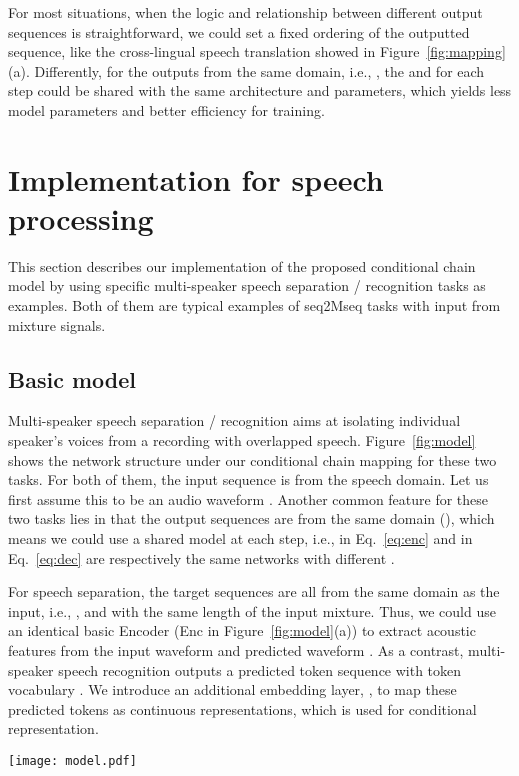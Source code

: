 \documentclass{article}
\begin{document}
For most situations, when the logic and relationship between different output sequences is straightforward, we could set a fixed ordering of the outputted sequence, like the cross-lingual speech translation showed in Figure~\ref{fig:mapping}(a). 
Differently, for the outputs from the same domain, i.e.,  , the  and  for each step could be shared with the same architecture and parameters, which yields less model parameters and better efficiency for training. 


\section{Implementation for speech processing}\label{sec:imp}
This section describes our implementation of the proposed conditional chain model by using specific multi-speaker speech separation / recognition tasks as examples. Both of them are typical examples of seq2Mseq tasks with input from mixture signals. 

\subsection{Basic model}
Multi-speaker speech separation / recognition aims at isolating individual speaker's voices from a recording with overlapped speech. 
Figure~\ref{fig:model} shows the network structure under our conditional chain mapping for these two tasks. 
For both of them, the input sequence is from the speech domain. Let us first assume this to be an audio waveform . 
Another common feature for these two tasks lies in that the output sequences are from the same domain (), which means we could use a shared model at each step, i.e.,  in Eq.~\ref{eq:enc} and  in Eq.~\ref{eq:dec} are respectively the same networks with different . 

For speech separation, the target sequences  are all from the same domain as the input, i.e., , and with the same length of the input mixture. Thus, we could use an identical basic Encoder (Enc in Figure~\ref{fig:model}(a)) to extract acoustic features from the input waveform  and predicted waveform . 
As a contrast, multi-speaker speech recognition outputs a predicted token sequence  with token vocabulary .
We introduce an additional embedding layer, , to map these predicted tokens as continuous representations, which is used for conditional representation.

\begin{figure*}[tb]
  \centering
  \texttt{[image: model.pdf]}
  \caption{Sequence-to-multi-sequence mapping with conditional model for multi speaker speech separation or recognition. In each sub-figure, the block with same name are all shared. }
  \label{fig:model}
\end{figure*}
\vspace{-0.1cm}
\end{document}
